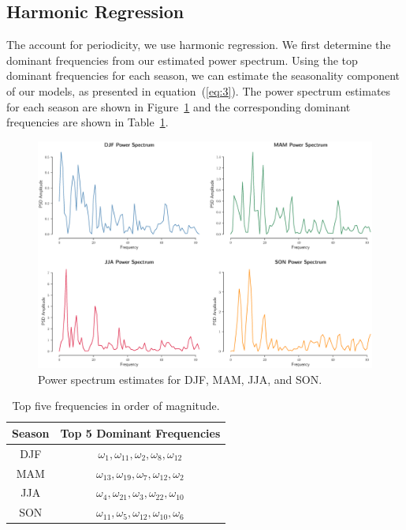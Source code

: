 \documentclass[12pt]{article}
\begin{document}
\subsection{Harmonic Regression}
The account for periodicity, we use harmonic regression. We first determine the dominant frequencies from our estimated power spectrum. Using the top dominant frequencies for each season, we can estimate the seasonality component of our models, as presented in equation~(\ref{eq:3}). The  power spectrum estimates for each season are shown in Figure~\ref{psd} and the corresponding dominant frequencies are shown in Table~\ref{top_freqs}. 
\begin{figure}[H]
  \centering
  \includegraphics[width=1\textwidth,height=0.5\textheight,center]{figs/psd}
  \caption{Power spectrum estimates for DJF, MAM, JJA, and SON.}\label{psd}
\end{figure}
\begin{table}[H]
\centering
\begin{tabular}{|c|c|}
\hline
\textbf{Season}       & \textbf{Top 5 Dominant Frequencies} \\ \hline\hline
DJF & $\omega_1, \omega_{11}, \omega_2, \omega_8, \omega_{12}$ \\ \hline
MAM & $\omega_{13}, \omega_{19}, \omega_7, \omega_{12}, \omega_{2}$ \\ \hline
JJA & $\omega_4, \omega_{21}, \omega_3, \omega_{22}, \omega_{10}$ \\ \hline
SON & $\omega_{11}, \omega_{5}, \omega_{12}, \omega_{10}, \omega_{6}$ \\ \hline
\end{tabular}
\caption{Top five frequencies in order of magnitude.}\label{top_freqs}
\end{table}
\end{document}
